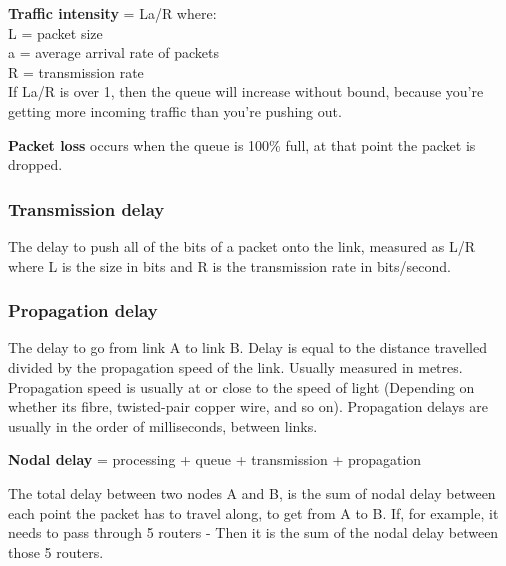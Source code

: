 \textbf{Traffic intensity} = La/R where: \\
L = packet size\\
a = average arrival rate of packets\\
R = transmission rate\\

If La/R is over 1, then the queue will increase without bound, because you're
getting more incoming traffic than you're pushing out.

\textbf{Packet loss} occurs when the queue is 100\% full, at that point the
packet is dropped.

\subsubsection{Transmission delay}
The delay to push all of the bits of a packet onto the link, measured as L/R
where L is the size in bits and R is the transmission rate in bits/second.

\subsubsection{Propagation delay}
The delay to go from link A to link B. Delay is equal to the distance travelled
divided by the propagation speed of the link. Usually measured in metres. Propagation
speed is usually at or close to the speed of light (Depending on whether its fibre,
twisted-pair copper wire, and so on). Propagation delays are usually in the order
of milliseconds, between links.

\textbf{Nodal delay} = processing + queue + transmission + propagation

The total delay between two nodes A and B, is the sum of nodal delay between each
point the packet has to travel along, to get from A to B. If, for example, it
needs to pass through 5 routers - Then it is the sum of the nodal delay between
those 5 routers.
